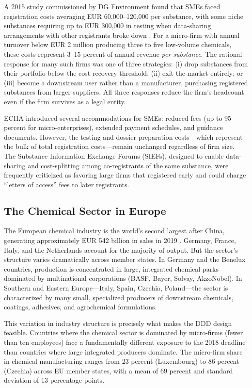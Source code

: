 \documentclass[12pt]{article}
\begin{document}
A 2015 study commissioned by DG Environment found that SMEs faced registration costs averaging EUR 60,000--120,000 per substance, with some niche substances requiring up to EUR 300,000 in testing when data-sharing arrangements with other registrants broke down \citep{milieu2015}. For a micro-firm with annual turnover below EUR 2 million producing three to five low-volume chemicals, these costs represent 3--15 percent of annual revenue \textit{per substance}. The rational response for many such firms was one of three strategies: (i) drop substances from their portfolio below the cost-recovery threshold; (ii) exit the market entirely; or (iii) become a downstream user rather than a manufacturer, purchasing registered substances from larger suppliers. All three responses reduce the firm's headcount even if the firm survives as a legal entity.

ECHA introduced several accommodations for SMEs: reduced fees (up to 95 percent for micro-enterprises), extended payment schedules, and guidance documents. However, the testing and dossier-preparation costs---which represent the bulk of total registration costs---remain unchanged regardless of firm size. The Substance Information Exchange Forums (SIEFs), designed to enable data-sharing and cost-splitting among co-registrants of the same substance, were frequently criticized as favoring large firms that registered early and could charge ``letters of access'' fees to later registrants.

\subsection{The Chemical Sector in Europe}

The European chemical industry is the world's second largest after China, generating approximately EUR 542 billion in sales in 2019 \citep{cefic2019}. Germany, France, Italy, and the Netherlands account for the majority of output. But the sector's structure varies dramatically across member states. In Germany and the Benelux countries, production is concentrated in large, integrated chemical parks dominated by multinational corporations (BASF, Bayer, Solvay, AkzoNobel). In Southern and Eastern Europe---Italy, Spain, Czechia, Poland---the sector is characterized by many small, specialized producers of downstream chemicals, coatings, adhesives, and agrochemical formulations.

This variation in industry structure is precisely what makes the DDD design feasible. Countries where the chemical sector is dominated by micro-firms (fewer than ten employees) face a fundamentally different exposure to the 2018 deadline than countries where large integrated producers dominate. The micro-firm share in chemical manufacturing ranges from 23 percent (Luxembourg) to 86 percent (Czechia) across EU member states, with a mean of 69 percent and standard deviation of 13 percentage points.
\end{document}
